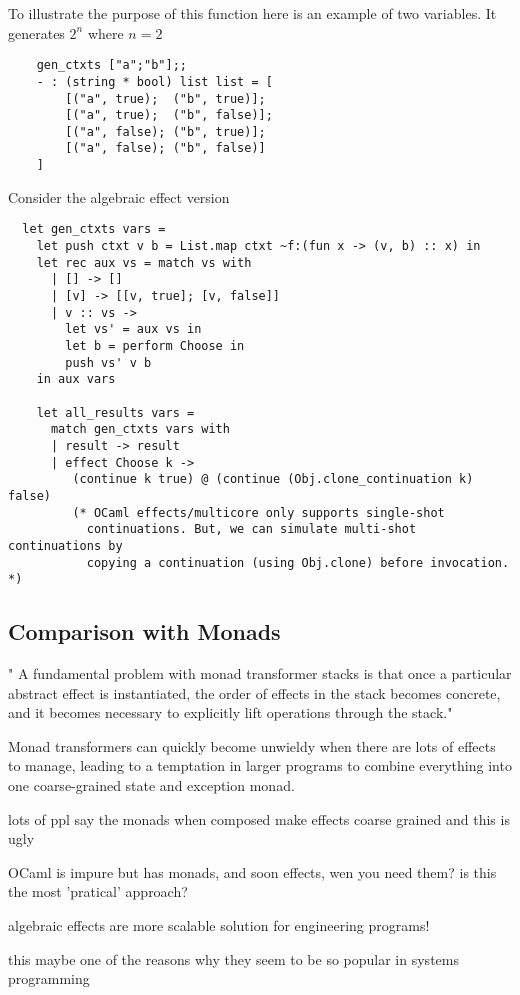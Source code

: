 To illustrate the purpose of this function here
is an example of two variables.
It generates $2^n$ where $n = 2$

\begin{verbatim}
    gen_ctxts ["a";"b"];;
    - : (string * bool) list list = [
        [("a", true);  ("b", true)];
        [("a", true);  ("b", false)];
        [("a", false); ("b", true)];
        [("a", false); ("b", false)]
    ]
\end{verbatim}

Consider the algebraic effect version

\begin{verbatim}
  let gen_ctxts vars =
    let push ctxt v b = List.map ctxt ~f:(fun x -> (v, b) :: x) in
    let rec aux vs = match vs with
      | [] -> []
      | [v] -> [[v, true]; [v, false]]
      | v :: vs ->
        let vs' = aux vs in
        let b = perform Choose in
        push vs' v b
    in aux vars

    let all_results vars =
      match gen_ctxts vars with
      | result -> result
      | effect Choose k ->
         (continue k true) @ (continue (Obj.clone_continuation k) false)
         (* OCaml effects/multicore only supports single-shot
           continuations. But, we can simulate multi-shot continuations by
           copying a continuation (using Obj.clone) before invocation. *)
\end{verbatim}

\subsection{Comparison with Monads}
"
A fundamental problem with monad transformer stacks is that
once a particular abstract effect is instantiated,
the order of effects in the stack becomes concrete,
and it becomes necessary to explicitly lift operations
through the stack."
\cite{kammar2013handlers}

Monad transformers can quickly become unwieldy when there are lots of effects to manage,
leading to a temptation in larger programs to combine everything into one coarse-grained state and exception monad.
\cite{brady2013programming}

lots of ppl say the monads when composed make effects coarse grained
and this is ugly

OCaml is impure but has monads, and soon effects, wen you need them?
is this the most 'pratical' approach?

algebraic effects are more scalable solution for engineering programs!

this maybe one of the reasons why they seem to be so popular in systems
programming

